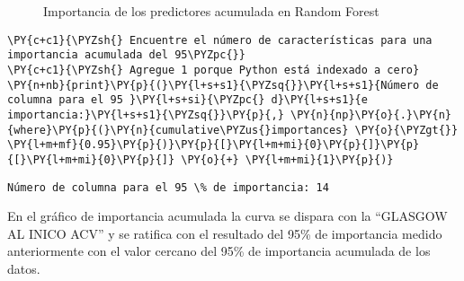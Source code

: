 \begin{center}
    	\begin{figure}[htb]
	\centering
	\caption{Importancia de los predictores acumulada en Random Forest}
	\label{fig:iparf}
	\end{figure}
\end{center}

    
    \begin{tcolorbox}[breakable, size=fbox, boxrule=1pt, pad at break*=1mm,colback=cellbackground, colframe=cellborder]
\begin{Verbatim}[commandchars=\\\{\}]
\PY{c+c1}{\PYZsh{} Encuentre el número de características para una importancia acumulada del 95\PYZpc{}}
\PY{c+c1}{\PYZsh{} Agregue 1 porque Python está indexado a cero}
\PY{n+nb}{print}\PY{p}{(}\PY{l+s+s1}{\PYZsq{}}\PY{l+s+s1}{Número de columna para el 95 }\PY{l+s+si}{\PYZpc{} d}\PY{l+s+s1}{e importancia:}\PY{l+s+s1}{\PYZsq{}}\PY{p}{,} \PY{n}{np}\PY{o}{.}\PY{n}{where}\PY{p}{(}\PY{n}{cumulative\PYZus{}importances} \PY{o}{\PYZgt{}} \PY{l+m+mf}{0.95}\PY{p}{)}\PY{p}{[}\PY{l+m+mi}{0}\PY{p}{]}\PY{p}{[}\PY{l+m+mi}{0}\PY{p}{]} \PY{o}{+} \PY{l+m+mi}{1}\PY{p}{)}
\end{Verbatim}
\end{tcolorbox}

    \begin{Verbatim}[commandchars=\\\{\}]
Número de columna para el 95 \% de importancia: 14
    \end{Verbatim}

    En el gráfico de importancia acumulada la curva se dispara con la
``GLASGOW AL INICO ACV'' y se ratifica con el resultado del 95\% de
importancia medido anteriormente con el valor cercano del 95\% de
importancia acumulada de los datos.

